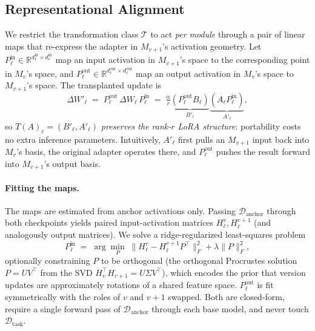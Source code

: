\subsection{Representational Alignment}

We restrict the transformation class $\mathcal{T}$ to act \emph{per module}
through a pair of linear maps that re-express the adapter in $M_{v+1}$'s
activation geometry. Let
$P^{\mathrm{in}}_\ell \in \mathbb{R}^{d^{\mathrm{in}}_\ell \times d^{\mathrm{in}}_\ell}$
map an input activation in $M_{v+1}$'s space to the corresponding point in
$M_v$'s space, and
$P^{\mathrm{out}}_\ell \in \mathbb{R}^{d^{\mathrm{out}}_\ell \times d^{\mathrm{out}}_\ell}$
map an output activation in $M_v$'s space to $M_{v+1}$'s space. The transplanted
update is
\begin{equation}
  \Delta W'_\ell
  \;=\; P^{\mathrm{out}}_\ell \, \Delta W_\ell \, P^{\mathrm{in}}_\ell
  \;=\; \tfrac{\alpha}{r}
        \underbrace{\left(P^{\mathrm{out}}_\ell B_\ell\right)}_{B'_\ell}
        \underbrace{\left(A_\ell P^{\mathrm{in}}_\ell\right)}_{A'_\ell},
\label{eq:transplant}
\end{equation}
so $T(A)_\ell = (B'_\ell, A'_\ell)$ \emph{preserves the rank-$r$ LoRA
structure}: portability costs no extra inference parameters. Intuitively,
$A'_\ell$ first pulls an $M_{v+1}$ input back into $M_v$'s basis, the original
adapter operates there, and $P^{\mathrm{out}}_\ell$ pushes the result forward
into $M_{v+1}$'s output basis.

\paragraph{Fitting the maps.}
The maps are estimated from anchor activations only. Passing
$\mathcal{D}_{\mathrm{anchor}}$ through both checkpoints yields paired
input-activation matrices $H^{v}_\ell, H^{v+1}_\ell$ (and analogously output
matrices). We solve a ridge-regularized least-squares problem
\begin{equation}
  P^{\mathrm{in}}_\ell
  \;=\;
  \arg\min_{P}\;
  \big\lVert H^{v}_\ell - H^{v+1}_\ell P^\top \big\rVert_F^2
  + \lambda \lVert P \rVert_F^2 ,
\label{eq:procrustes}
\end{equation}
optionally constraining $P$ to be orthogonal (the orthogonal Procrustes
solution $P = UV^\top$ from the SVD $H_v^\top H_{v+1} = U\Sigma V^\top$), which
encodes the prior that version updates are approximately rotations of a shared
feature space. $P^{\mathrm{out}}_\ell$ is fit symmetrically with the roles of
$v$ and $v{+}1$ swapped. Both are closed-form, require a single forward pass of
$\mathcal{D}_{\mathrm{anchor}}$ through each base model, and never touch
$\mathcal{D}_{\mathrm{task}}$.

